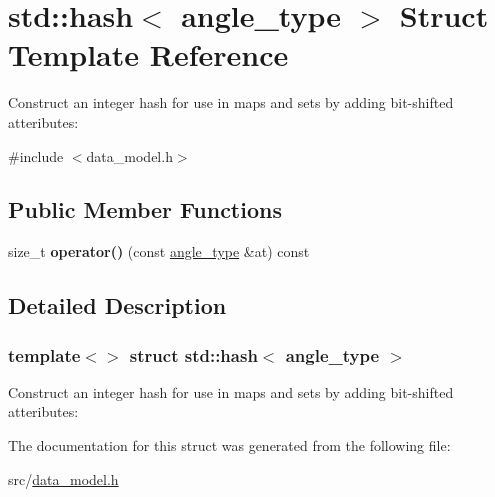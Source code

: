 \hypertarget{structstd_1_1hash_3_01angle__type_01_4}{}\section{std\+:\+:hash$<$ angle\+\_\+type $>$ Struct Template Reference}
\label{structstd_1_1hash_3_01angle__type_01_4}


Construct an integer hash for use in maps and sets by adding bit-\/shifted atteributes\+:  




{\ttfamily \#include $<$data\+\_\+model.\+h$>$}

\subsection*{Public Member Functions}
\begin{DoxyCompactItemize}
\item 
\mbox{\label{structstd_1_1hash_3_01angle__type_01_4_a7057058e8815eaaee739fe49d1e76d58}} 
size\+\_\+t {\bfseries operator()} (const \hyperlink{structtricl_1_1angle__type}{angle\+\_\+type} \&at) const
\end{DoxyCompactItemize}


\subsection{Detailed Description}
\subsubsection*{template$<$$>$\newline
struct std\+::hash$<$ angle\+\_\+type $>$}

Construct an integer hash for use in maps and sets by adding bit-\/shifted atteributes\+: 

The documentation for this struct was generated from the following file\+:\begin{DoxyCompactItemize}
\item 
src/\hyperlink{data__model_8h}{data\+\_\+model.\+h}\end{DoxyCompactItemize}
